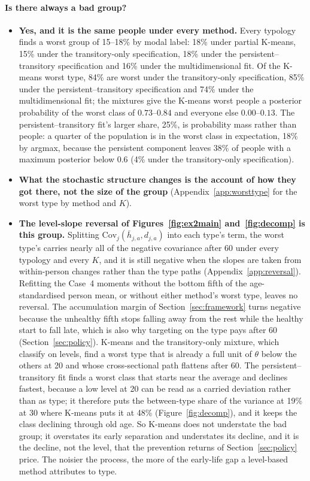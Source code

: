 \documentclass[11pt]{article}
\newcommand{\Cov}{\mathrm{Cov}}
\begin{document}
	\paragraph{Is there always a bad group?}
	\begin{itemize}
		\item \textbf{Yes, and it is the same people under every method.} Every typology finds a worst group of 15--18\% by modal label: 18\% under partial K-means, 15\% under the transitory-only specification, 18\% under the persistent--transitory specification and 16\% under the multidimensional fit. Of the K-means worst type, 84\% are worst under the transitory-only specification, 85\% under the persistent--transitory specification and 74\% under the multidimensional fit; the mixtures give the K-means worst people a posterior probability of the worst class of $0.73$--$0.84$ and everyone else $0.00$--$0.13$. The persistent--transitory fit's larger share, 25\%, is probability mass rather than people: a quarter of the population is in the worst class in expectation, 18\% by argmax, because the persistent component leaves 38\% of people with a maximum posterior below $0.6$ (4\% under the transitory-only specification).
		\item \textbf{What the stochastic structure changes is the account of how they got there, not the size of the group} (Appendix~\ref{app:worsttype} for the worst type by method and $K$).
		\item \textbf{The level-slope reversal of Figures~\ref{fig:ex2main} and~\ref{fig:decomp} is this group.} Splitting $\Cov_j(\bar h_{j,a},d_{j,a})$ into each type's term, the worst type's carries nearly all of the negative covariance after 60 under every typology and every $K$, and it is still negative when the slopes are taken from within-person changes rather than the type paths (Appendix~\ref{app:reversal}). Refitting the Case~4 moments without the bottom fifth of the age-standardised person mean, or without either method's worst type, leaves no reversal. The accumulation margin of Section~\ref{sec:framework} turns negative because the unhealthy fifth stops falling away from the rest while the healthy start to fall late, which is also why targeting on the type pays after 60 (Section~\ref{sec:policy}). K-means and the transitory-only mixture, which classify on levels, find a worst type that is already a full unit of $\theta$ below the others at 20 and whose cross-sectional path flattens after 60. The persistent--transitory fit finds a worst class that starts near the average and declines fastest, because a low level at 20 can be read as a carried deviation rather than as type; it therefore puts the between-type share of the variance at 19\% at 30 where K-means puts it at 48\% (Figure~\ref{fig:decomp}), and it keeps the class declining through old age. So K-means does not understate the bad group; it overstates its early separation and understates its decline, and it is the decline, not the level, that the prevention returns of Section~\ref{sec:policy} price. The noisier the process, the more of the early-life gap a level-based method attributes to type.
	\end{itemize}
\end{document}
